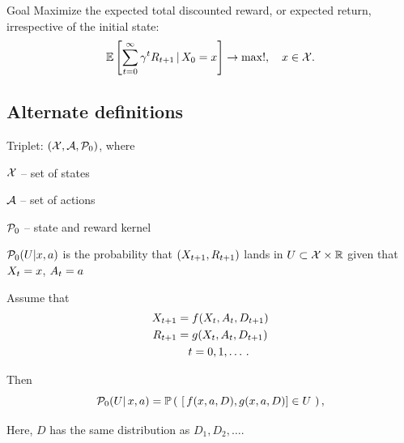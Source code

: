 {
	\begin{block}{Goal}
	Maximize the \alert{expected total discounted reward}, 
	or \alert{expected return}, irrespective of the initial state:
	\[
	{\mathbb E}\left[ \sum_{t=0}^\infty \gamma^t R_{t+1} \,|\, X_0 = x\right] \rightarrow \max!, \quad x\in\mathcal{X}. 
	\]
	\end{block}

}


\subsection{Alternate definitions}
{
\begin{Definition}
Triplet: $(\mathcal{X},\mathcal{A},\mathcal{P}_{0})$, where 
\bi[<+->]
\item $\mathcal{X}$ -- set of states
\item $\mathcal{A}$ -- set of actions
\item $\mathcal{P}_{0}$ -- state and reward kernel
\item[] $\mathcal{P}_{0}(U|x,a)$ is the probability that $(X_{t+1},R_{t+1})$ lands in $U\subset \mathcal{X}\times \mathbb R$ given that $X_t = x$, $A_t = a$
\ei
\end{Definition}

}

{
Assume that
	\begin{align*}
	\begin{split}
		X_{t+1} &= f(X_t,A_t,D_{t+1}) \\
		R_{t+1} &= g(X_t,A_t,D_{t+1})\\
		 &\quad t=0,1,\ldots\,.
	\end{split}
	\end{align*}

Then
\[
\mathcal{P}_{0}(U|\,x,a) = {\mathbb P}\left( \,\,[\,f(x,a,D),g(x,a,D)] \in U\,\, \right),
\]

Here, $D$ has the same distribution as $D_1,D_2,\ldots$.

}

